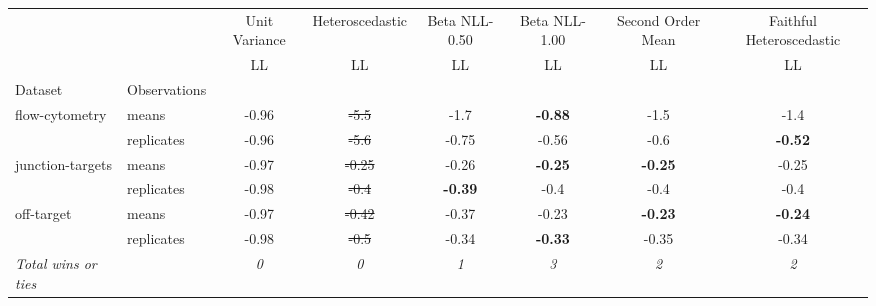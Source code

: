 \begin{tabular}{ll|c|c|c|c|c|c}
\toprule
{} & {} & {Unit Variance} & {Heteroscedastic} & {Beta NLL-0.50} & {Beta NLL-1.00} & {Second Order Mean} & {Faithful Heteroscedastic} \\
{} & {} & {LL} & {LL} & {LL} & {LL} & {LL} & {LL} \\
{Dataset} & {Observations} & {} & {} & {} & {} & {} & {} \\
\midrule
\multirow[t]{2}{*}{flow-cytometry} & means & -0.96 & \sout{-5.5} & -1.7 & \textbf{-0.88} & -1.5 & -1.4 \\
 & replicates & -0.96 & \sout{-5.6} & -0.75 & -0.56 & -0.6 & \textbf{-0.52} \\
\multirow[t]{2}{*}{junction-targets} & means & -0.97 & \sout{-0.25} & -0.26 & \textbf{-0.25} & \textbf{-0.25} & -0.25 \\
 & replicates & -0.98 & \sout{-0.4} & \textbf{-0.39} & -0.4 & -0.4 & -0.4 \\
\multirow[t]{2}{*}{off-target} & means & -0.97 & \sout{-0.42} & -0.37 & -0.23 & \textbf{-0.23} & \textbf{-0.24} \\
 & replicates & -0.98 & \sout{-0.5} & -0.34 & \textbf{-0.33} & -0.35 & -0.34 \\
\textit{{Total wins or ties}} &  & \textit{0} & \textit{0} & \textit{1} & \textit{3} & \textit{2} & \textit{2} \\
\bottomrule
\end{tabular}
